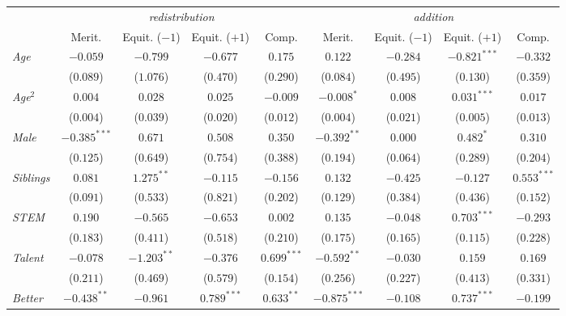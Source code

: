 \begin{table}[htpb]
\centering
\footnotesize
\setlength{\tabcolsep}{3.5pt}
\begin{tabular}{l cccc | cccc}
\toprule
 & \multicolumn{4}{c}{\textit{redistribution}} & \multicolumn{4}{c}{\textit{addition}} \\
\cmidrule(lr){2-5} \cmidrule(lr){6-9}
 & Merit. & \shortstack{Equit.\\($-1$)} & \shortstack{Equit.\\($+1$)} & Comp. & Merit. & \shortstack{Equit.\\($-1$)} & \shortstack{Equit.\\($+1$)} & Comp. \\
\midrule
\textit{Age} & $-0.059$ & $-0.799$ & $-0.677$ & $0.175$ & $0.122$ & $-0.284$ & $-0.821^{***}$ & $-0.332$ \\
           & ($0.089$) & ($1.076$) & ($0.470$) & ($0.290$) & ($0.084$) & ($0.495$) & ($0.130$) & ($0.359$) \\
\textit{Age}$^2$ & $0.004$ & $0.028$ & $0.025$ & $-0.009$ & $-0.008^{*}$ & $0.008$ & $0.031^{***}$ & $0.017$ \\
           & ($0.004$) & ($0.039$) & ($0.020$) & ($0.012$) & ($0.004$) & ($0.021$) & ($0.005$) & ($0.013$) \\
\textit{Male} & $-0.385^{***}$ & $0.671$ & $0.508$ & $0.350$ & $-0.392^{**}$ & $0.000$ & $0.482^{*}$ & $0.310$ \\
           & ($0.125$) & ($0.649$) & ($0.754$) & ($0.388$) & ($0.194$) & ($0.064$) & ($0.289$) & ($0.204$) \\
\textit{Siblings} & $0.081$ & $1.275^{**}$ & $-0.115$ & $-0.156$ & $0.132$ & $-0.425$ & $-0.127$ & $0.553^{***}$ \\
           & ($0.091$) & ($0.533$) & ($0.821$) & ($0.202$) & ($0.129$) & ($0.384$) & ($0.436$) & ($0.152$) \\
\textit{STEM} & $0.190$ & $-0.565$ & $-0.653$ & $0.002$ & $0.135$ & $-0.048$ & $0.703^{***}$ & $-0.293$ \\
           & ($0.183$) & ($0.411$) & ($0.518$) & ($0.210$) & ($0.175$) & ($0.165$) & ($0.115$) & ($0.228$) \\
\textit{Talent} & $-0.078$ & $-1.203^{**}$ & $-0.376$ & $0.699^{***}$ & $-0.592^{**}$ & $-0.030$ & $0.159$ & $0.169$ \\
           & ($0.211$) & ($0.469$) & ($0.579$) & ($0.154$) & ($0.256$) & ($0.227$) & ($0.413$) & ($0.331$) \\
\textit{Better} & $-0.438^{**}$ & $-0.961$ & $0.789^{***}$ & $0.633^{**}$ & $-0.875^{***}$ & $-0.108$ & $0.737^{***}$ & $-0.199$ \\

\end{tabular}
\end{table}
